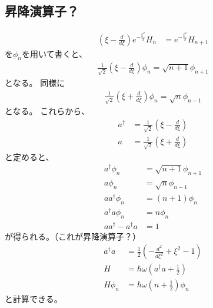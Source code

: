 \documentclass[uplatex]{jsarticle}
\begin{document}
\subsection{昇降演算子？}
\begin{align*}
(\xi-\frac{d}{d\xi})e^{-\frac{\xi^2}{2}}H_n&=e^{-\frac{\xi^2}{2}}H_{n+1}
\end{align*}
を$\phi_n$を用いて書くと、
\begin{align*}
\frac{1}{\sqrt{2}}(\xi-\frac{d}{d\xi})\phi_n=\sqrt{n+1}\phi_{n+1}
\end{align*}
となる。
同様に
\begin{align*}
\frac{1}{\sqrt{2}}(\xi+\frac{d}{d\xi})\phi_n=\sqrt{n}\phi_{n-1}
\end{align*}
となる。
これらから、
\begin{align*}
a^\dagger&=\frac{1}{\sqrt{2}}(\xi-\frac{d}{d\xi})\\
a&=\frac{1}{\sqrt{2}}(\xi+\frac{d}{d\xi})
\end{align*}
と定めると、
\begin{align*}
a^\dagger\phi_n&=\sqrt{n+1}\phi_{n+1}\\
a\phi_n&=\sqrt{n}\phi_{n-1}\\
aa^\dagger\phi_n&=(n+1)\phi_n\\
a^\dagger a\phi_n&=n\phi_n\\
aa^\dagger-a^\dagger a&=1
\end{align*}
が得られる。（これが昇降演算子？）
\begin{align*}
a^\dagger a&=\frac{1}{2}(-\frac{d^2}{d\xi^2}+\xi^2-1)\\
H&=\hbar\omega(a^\dagger a+\frac{1}{2})\\
H\phi_n&=\hbar\omega(n+\frac{1}{2})\phi_n
\end{align*}
と計算できる。
\end{document}
